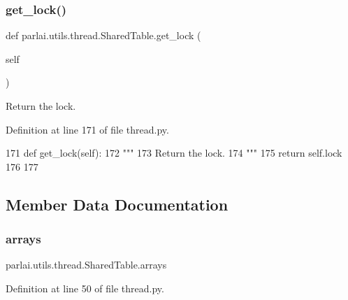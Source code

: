 \subsubsection{\texorpdfstring{get\+\_\+lock()}{get\_lock()}}
{\footnotesize\ttfamily def parlai.\+utils.\+thread.\+Shared\+Table.\+get\+\_\+lock (\begin{DoxyParamCaption}\item[{}]{self }\end{DoxyParamCaption})}

\begin{DoxyVerb}Return the lock.
\end{DoxyVerb}
 

Definition at line 171 of file thread.\+py.


\begin{DoxyCode}
171     \textcolor{keyword}{def }get\_lock(self):
172         \textcolor{stringliteral}{"""}
173 \textcolor{stringliteral}{        Return the lock.}
174 \textcolor{stringliteral}{        """}
175         \textcolor{keywordflow}{return} self.lock
176 
177 
\end{DoxyCode}


\subsection{Member Data Documentation}
\mbox{\label{classparlai_1_1utils_1_1thread_1_1SharedTable_a722e0cb6428af2282f4a2697c2c86d01}} 
\subsubsection{\texorpdfstring{arrays}{arrays}}
{\footnotesize\ttfamily parlai.\+utils.\+thread.\+Shared\+Table.\+arrays}



Definition at line 50 of file thread.\+py.

\mbox{\label{classparlai_1_1utils_1_1thread_1_1SharedTable_aec0fa85ca2544dd6220db34c7da01a08}} 
